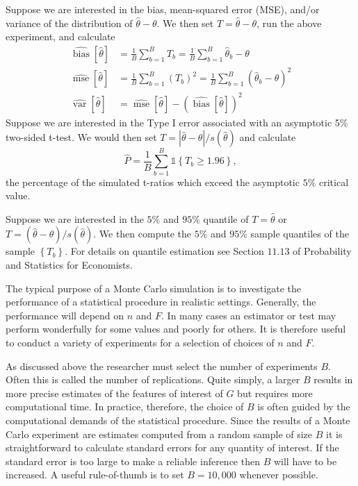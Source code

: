 \documentclass[10pt]{article}
\begin{document}
Suppose we are interested in the bias, mean-squared error (MSE), and/or variance of the distribution of $\widehat{\theta}-\theta$. We then set $T=\widehat{\theta}-\theta$, run the above experiment, and calculate
$$
\begin{aligned}
\widehat{\operatorname{bias}}[\widehat{\theta}] &=\frac{1}{B} \sum_{b=1}^{B} T_{b}=\frac{1}{B} \sum_{b=1}^{B} \widehat{\theta}_{b}-\theta \\
\widehat{\operatorname{mse}}[\widehat{\theta}] &=\frac{1}{B} \sum_{b=1}^{B}\left(T_{b}\right)^{2}=\frac{1}{B} \sum_{b=1}^{B}\left(\widehat{\theta}_{b}-\theta\right)^{2} \\
\widehat{\operatorname{var}}[\widehat{\theta}] &=\widehat{\operatorname{mse}}[\widehat{\theta}]-(\widehat{\operatorname{bias}}[\hat{\theta}])^{2}
\end{aligned}
$$
Suppose we are interested in the Type I error associated with an asymptotic 5\% two-sided t-test. We would then set $T=|\widehat{\theta}-\theta| / s(\widehat{\theta})$ and calculate
$$
\widehat{P}=\frac{1}{B} \sum_{b=1}^{B} \mathbb{1}\left\{T_{b} \geq 1.96\right\},
$$
the percentage of the simulated t-ratios which exceed the asymptotic $5 \%$ critical value.

Suppose we are interested in the $5 \%$ and $95 \%$ quantile of $T=\widehat{\theta}$ or $T=(\widehat{\theta}-\theta) / s(\widehat{\theta})$. We then compute the $5 \%$ and $95 \%$ sample quantiles of the sample $\left\{T_{b}\right\}$. For details on quantile estimation see Section $11.13$ of Probability and Statistics for Economists.

The typical purpose of a Monte Carlo simulation is to investigate the performance of a statistical procedure in realistic settings. Generally, the performance will depend on $n$ and $F$. In many cases an estimator or test may perform wonderfully for some values and poorly for others. It is therefore useful to conduct a variety of experiments for a selection of choices of $n$ and $F$.

As discussed above the researcher must select the number of experiments $B$. Often this is called the number of replications. Quite simply, a larger $B$ results in more precise estimates of the features of interest of $G$ but requires more computational time. In practice, therefore, the choice of $B$ is often guided by the computational demands of the statistical procedure. Since the results of a Monte Carlo experiment are estimates computed from a random sample of size $B$ it is straightforward to calculate standard errors for any quantity of interest. If the standard error is too large to make a reliable inference then $B$ will have to be increased. A useful rule-of-thumb is to set $B=10,000$ whenever possible.
\end{document}

